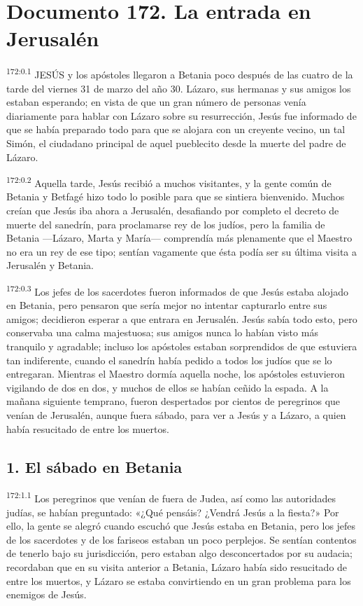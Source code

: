 \chapter{Documento 172. La entrada en Jerusalén}
\par 
\textsuperscript{172:0.1} JESÚS y los apóstoles llegaron a Betania poco después de las cuatro de la tarde del viernes 31 de marzo del año 30. Lázaro, sus hermanas y sus amigos los estaban esperando; en vista de que un gran número de personas venía diariamente para hablar con Lázaro sobre su resurrección, Jesús fue informado de que se había preparado todo para que se alojara con un creyente vecino, un tal Simón, el ciudadano principal de aquel pueblecito desde la muerte del padre de Lázaro.

\par 
\textsuperscript{172:0.2} Aquella tarde, Jesús recibió a muchos visitantes, y la gente común de Betania y Betfagé hizo todo lo posible para que se sintiera bienvenido. Muchos creían que Jesús iba ahora a Jerusalén, desafiando por completo el decreto de muerte del sanedrín, para proclamarse rey de los judíos, pero la familia de Betania ---Lázaro, Marta y María--- comprendía más plenamente que el Maestro no era un rey de ese tipo; sentían vagamente que ésta podía ser su última visita a Jerusalén y Betania.

\par 
\textsuperscript{172:0.3} Los jefes de los sacerdotes fueron informados de que Jesús estaba alojado en Betania, pero pensaron que sería mejor no intentar capturarlo entre sus amigos; decidieron esperar a que entrara en Jerusalén. Jesús sabía todo esto, pero conservaba una calma majestuosa; sus amigos nunca lo habían visto más tranquilo y agradable; incluso los apóstoles estaban sorprendidos de que estuviera tan indiferente, cuando el sanedrín había pedido a todos los judíos que se lo entregaran. Mientras el Maestro dormía aquella noche, los apóstoles estuvieron vigilando de dos en dos, y muchos de ellos se habían ceñido la espada. A la mañana siguiente temprano, fueron despertados por cientos de peregrinos que venían de Jerusalén, aunque fuera sábado, para ver a Jesús y a Lázaro, a quien había resucitado de entre los muertos.

\section*{1. El sábado en Betania}
\par 
\textsuperscript{172:1.1} Los peregrinos que venían de fuera de Judea, así como las autoridades judías, se habían preguntado: «¿Qué pensáis? ¿Vendrá Jesús a la fiesta?» Por ello, la gente se alegró cuando escuchó que Jesús estaba en Betania, pero los jefes de los sacerdotes y de los fariseos estaban un poco perplejos. Se sentían contentos de tenerlo bajo su jurisdicción, pero estaban algo desconcertados por su audacia; recordaban que en su visita anterior a Betania, Lázaro había sido resucitado de entre los muertos, y Lázaro se estaba convirtiendo en un gran problema para los enemigos de Jesús.

